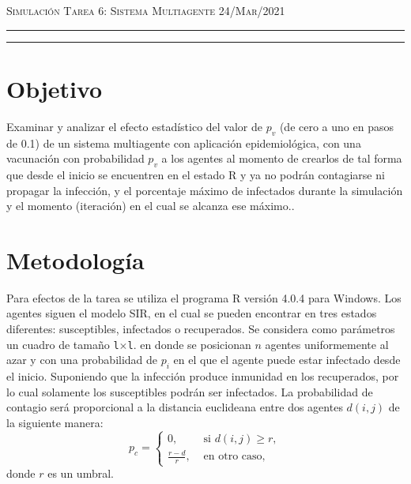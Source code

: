 \documentclass[12pt]{amsart}
\begin{document}
\pagestyle{empty}



\thispagestyle{empty}

{\scshape Simulación} \hfill {\scshape \Large Tarea 6: Sistema Multiagente} \hfill  {\scshape 24/Mar/2021}
\author{C. María Montemayor Palos}
\maketitle

\hrule
\hrule
\bigskip


\section{Objetivo}
Examinar y analizar el efecto estadístico del valor de $p_v$ (de cero a uno en pasos de 0.1) de un sistema multiagente con aplicación epidemiológica, con una vacunación con probabilidad $p_v$ a los agentes al momento de crearlos de tal forma que desde el inicio se encuentren en el estado R y ya no podrán contagiarse ni propagar la infección, y el porcentaje máximo de infectados durante la simulación y el momento (iteración) en el cual se alcanza ese máximo.\cite{dra}.

\section{Metodología}
Para efectos de la tarea se utiliza el programa R versión 4.0.4 \cite{R} para Windows. Los agentes siguen el modelo SIR, en el cual se pueden encontrar en tres estados diferentes: susceptibles, infectados o recuperados. Se considera como parámetros un cuadro de tamaño \texttt{l}$\times$\texttt{l}. en donde se posicionan $n$ agentes uniformemente al azar y con una probabilidad de $p_i$ en el que el agente puede estar infectado desde el inicio. Suponiendo que la infección produce inmunidad en los recuperados, por lo cual solamente los susceptibles podrán ser infectados. La probabilidad de contagio será proporcional a la distancia euclideana entre dos agentes $d(i, j)$ de la siguiente manera:
\begin{equation} 
p_c = \left \{ \begin{array}{ll}
  0, & \text{ si } d(i, j) \geq r, \\
  \displaystyle\frac{r - d}{r}, & \text{ en otro caso,} \end{array}
  \right.
  \label{ec1}
\end{equation}
  donde $r$ es un umbral.
\end{document}
